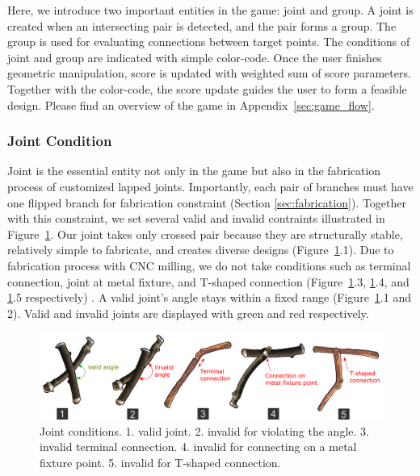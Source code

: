 Here, we introduce two important entities in the game: joint and group.
A joint is created when an intersecting pair is detected, and the pair forms a group.
The group is used for evaluating connections between target points.
The conditions of joint and group are indicated with simple color-code.
Once the user finishes geometric manipulation, score is updated with weighted sum of score parameters.
Together with the color-code, the score update guides the user to form a feasible design.
Please find an overview of the game  in Appendix~\ref{sec:game_flow}.



\subsubsection{Joint Condition}
\label{sec:joint}
Joint is the essential entity not only in the game but also in the fabrication process of customized lapped joints.
Importantly, each pair of branches must have one flipped branch for fabrication constraint (Section \ref{sec:fabrication}).
Together with this constraint, we set several valid and invalid contraints illustrated in Figure~\ref{fig:joint_condition}.
Our joint takes only crossed pair because they are structurally stable, relatively simple to fabricate, and creates diverse designs (Figure~\ref{fig:joint_condition}.1).
Due to fabrication process with CNC milling, we do not take conditions such as terminal connection, joint at metal fixture, and T-shaped connection (Figure~\ref{fig:joint_condition}.3, \ref{fig:joint_condition}.4, and \ref{fig:joint_condition}.5 respectively) .
A valid joint's angle stays within a fixed range (Figure~\ref{fig:joint_condition}.1 and 2).
Valid and invalid joints are displayed with green and red respectively.

\begin{figure}[ht]
	\begin{center}
		\includegraphics[width = 0.4\paperwidth]{images/system/joint_conditions_3.png}
		\caption{Joint conditions. 1. valid joint. 2. invalid for violating the angle. 3. invalid terminal connection. 4. invalid for connecting on a metal fixture point. 5. invalid for T-shaped connection.}
		\label{fig:joint_condition}
	\end{center}
\end{figure}

